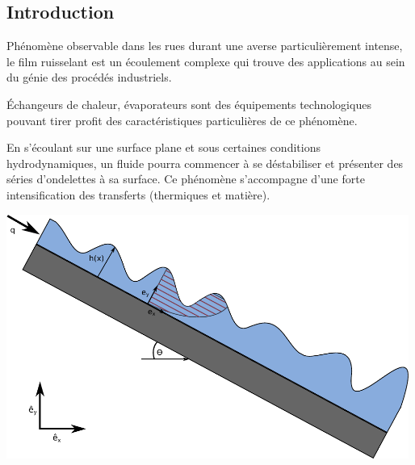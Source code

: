 \documentclass[a0,portrait]{a0poster}
\begin{document}
\begin{multicols}{2}
    \setlength{\columnseprule}{0pt}

    \section*{Introduction}

    Phénomène observable dans les rues durant une averse particulièrement intense, le film ruisselant est un écoulement complexe qui trouve des applications au sein du génie des procédés industriels.

    Échangeurs de chaleur, évaporateurs sont des équipements technologiques pouvant tirer profit des caractéristiques particulières de ce phénomène.

    En s'écoulant sur une surface plane et sous certaines conditions hydrodynamiques, un fluide pourra commencer à se déstabiliser et présenter des séries d'ondelettes à sa surface. Ce phénomène s'accompagne d'une forte intensification des transferts (thermiques et matière).

    \begin{multicols}{2}
        \begin{center}\vspace{.2cm}
        \end{center}\vspace{.2cm}
        \columnbreak
        \begin{center}\vspace{.5cm}
            \includegraphics[height=8cm]{thinfilm_unstable}
        \end{center}\vspace{.5cm}
    \end{multicols}


\end{multicols}
\end{document}
